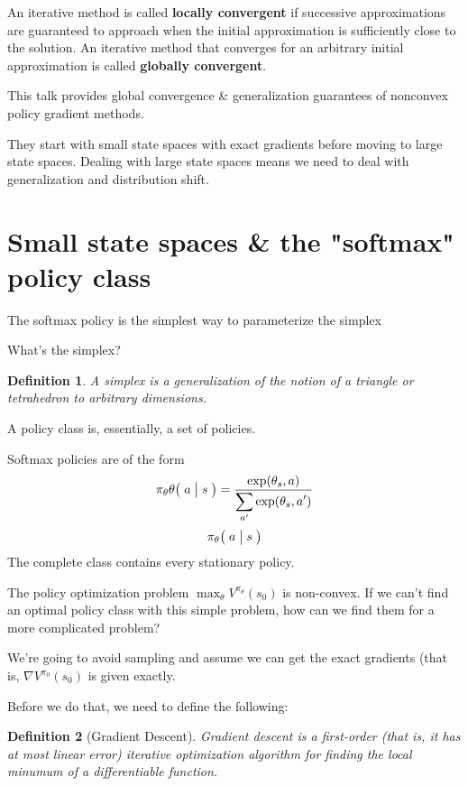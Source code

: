 \documentclass[12pt,reqno]{amsart}
\newtheorem{defn}{Definition}
\newcommand{\Cond}[2]{\bigm( {#1} \bigm\vert {#2}\bigm)}
\begin{document}
An iterative method is called \textbf{locally convergent} if successive approximations are guaranteed to approach when the initial approximation is sufficiently close to the solution. An iterative method that converges for an arbitrary initial approximation is called \textbf{globally convergent}.

This talk provides global convergence \& generalization guarantees of nonconvex policy gradient methods. 

They start with small state spaces with exact gradients before moving to large state spaces. Dealing with large state spaces means we need to deal with generalization and distribution shift.

\section{Small state spaces \& the "softmax" policy class}
The softmax policy is the simplest way to parameterize the simplex

What's the simplex?
\begin{defn}
        A simplex is a generalization of the notion of a triangle or tetrahedron to arbitrary dimensions.
\end{defn}
A policy class is, essentially, a set of policies.

Softmax policies are of the form
\begin{equation}
\pi_\theta\theta{\Cond{a}{s}}=\frac{\displaystyle \exp(\theta_s,a)}{\displaystyle \sum_{a'}\exp(\theta_s,a')}
\end{equation}
\begin{equation}
\pi_\theta{\Cond{a}{s}}
\end{equation}
The complete class contains every stationary policy.

The policy optimization problem $\max_{\theta} V^{\pi_{\theta}}(s_0)$ is non-convex. If we can't find an optimal policy class with this simple problem, how can we find them for a more complicated problem?

We're going to avoid sampling and assume we can get the exact gradients (that is, $\nabla V^{\pi_0}(s_0)$ is given exactly.

Before we do that, we need to define the following:

\begin{shaded}
\begin{defn}[Gradient Descent]
Gradient descent is a first-order (that is, it has at most linear error) iterative optimization algorithm for finding the local minumum of a differentiable function.
\end{defn}
\end{shaded}
\end{document}
